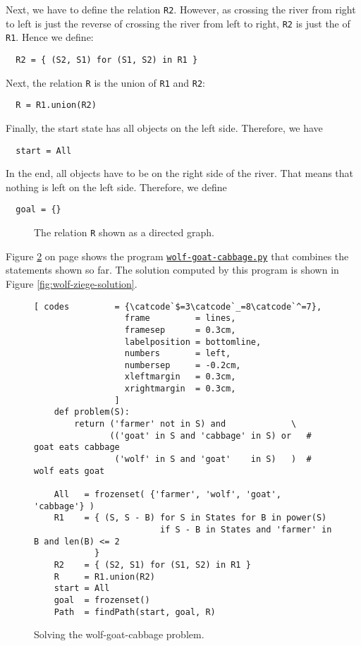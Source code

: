 Next, we have to define the relation \texttt{R2}.  However, as crossing the river from right to left
is just the reverse of crossing the river from left to right, \texttt{R2} is just the  of
\texttt{R1}.   Hence we define:
\begin{verbatim}
  R2 = { (S2, S1) for (S1, S2) in R1 }
\end{verbatim}
Next, the relation \texttt{R} is the union of \texttt{R1} and \texttt{R2}:
\begin{verbatim}
  R = R1.union(R2)
\end{verbatim}
Finally, the start state has all objects on the left side.  Therefore, we have
\begin{verbatim}
  start = All
\end{verbatim}
In the end, all objects have to be on the right side of the river.  That means that nothing is left
on the left side.  Therefore, we define
\begin{verbatim}
  goal = {}
\end{verbatim}


\begin{figure}[h]
  \centering


  \caption{The relation \texttt{R} shown as a directed graph.}
  \label{fig:wolf-goat-cabbage.pdf}
\end{figure}




Figure \ref{fig:wolf-ziege} on page \pageref{fig:wolf-ziege} shows the program
\href{https://github.com/karlstroetmann/Logik/blob/master/Python/wolf-goat-cabbage.py}{\texttt{wolf-goat-cabbage.py}}
that combines the statements shown so far.  The solution computed by this program is shown in Figure
 \ref{fig:wolf-ziege-solution}.

\begin{figure}[!ht]
  \centering
\begin{Verbatim}[ codes         = {\catcode`$=3\catcode`_=8\catcode`^=7},
                  frame         = lines, 
                  framesep      = 0.3cm, 
                  labelposition = bottomline,
                  numbers       = left,
                  numbersep     = -0.2cm,
                  xleftmargin   = 0.3cm,
                  xrightmargin  = 0.3cm,
                ]
    def problem(S):
        return ('farmer' not in S) and             \
               (('goat' in S and 'cabbage' in S) or   # goat eats cabbage
                ('wolf' in S and 'goat'    in S)   )  # wolf eats goat
    
    All   = frozenset( {'farmer', 'wolf', 'goat', 'cabbage'} )
    R1    = { (S, S - B) for S in States for B in power(S)
                         if S - B in States and 'farmer' in B and len(B) <= 2
            }
    R2    = { (S2, S1) for (S1, S2) in R1 }
    R     = R1.union(R2)
    start = All
    goal  = frozenset()
    Path  = findPath(start, goal, R)
\end{Verbatim} 
\vspace*{-0.3cm}
\caption{Solving the wolf-goat-cabbage problem.}  
\label{fig:wolf-ziege}
\end{figure}


